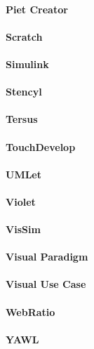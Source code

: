 \paragraph{Piet Creator}
\paragraph{Scratch}
\paragraph{Simulink}
\paragraph{Stencyl}
\paragraph{Tersus}
\paragraph{TouchDevelop}
\paragraph{UMLet}
\paragraph{Violet}
\paragraph{VisSim}
\paragraph{Visual Paradigm}
\paragraph{Visual Use Case}
\paragraph{WebRatio}
\paragraph{YAWL}
